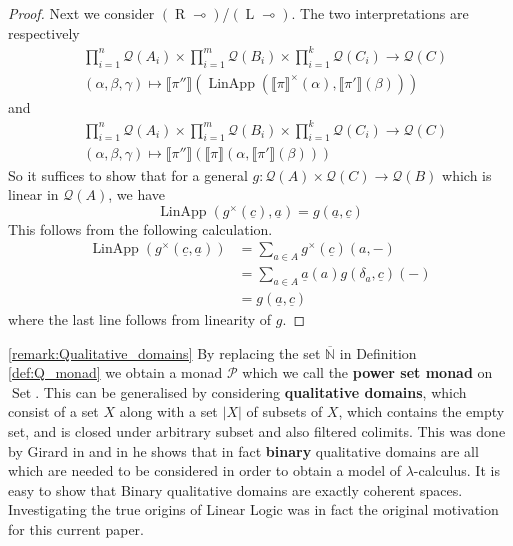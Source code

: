 \documentclass[runningheads]{llncs}
\newcommand{\bb}[1]{\mathbb{#1}}
\newcommand{\call}[1]{\mathcal{#1}}
\newcommand{\lto}{\longrightarrow}
\DeclareMathOperator{\set}{Set}
\begin{document}
\begin{proof}
Next we consider $(\operatorname{R}\multimap)$/$(\operatorname{L}\multimap)$. The two interpretations are respectively
\begin{align*}
&\prod_{i = 1}^n \call{Q}(A_i) \times \prod_{i = 1}^m \call{Q}(B_i) \times \prod_{i = 1}^k \call{Q}(C_i) \lto \call{Q}(C)\\
&(\alpha, \beta, \gamma) \longmapsto \llbracket \pi''\rrbracket(\operatorname{LinApp}(\llbracket \pi \rrbracket^\times(\alpha), \llbracket \pi'\rrbracket(\beta)))
\end{align*}
and
\begin{align*}
&\prod_{i = 1}^n \call{Q}(A_i) \times \prod_{i = 1}^m \call{Q}(B_i) \times \prod_{i = 1}^k \call{Q}(C_i) \lto \call{Q}(C)\\
&(\alpha, \beta, \gamma) \longmapsto \llbracket \pi'' \rrbracket(\llbracket \pi\rrbracket(\alpha, \llbracket \pi'\rrbracket(\beta)))
\end{align*}
So it suffices to show that for a general $g: \call{Q}(A) \times \call{Q}(C) \lto \call{Q}(B)$ which is linear in $\call{Q}(A)$, we have
\begin{equation}
\operatorname{LinApp}(g^\times(\underline{c}), \underline{a}) = g(\underline{a}, \underline{c})
\end{equation}
This follows from the following calculation.
\begin{align*}
\operatorname{LinApp}(g^\times(\underline{c}, \underline{a})) &= \sum_{a \in A}g^\times(\underline{c})(a, -)\\
&= \sum_{a \in A}\underline{a}(a)g(\delta_{a}, \underline{c})(-)\\
&= g(\underline{a}, \underline{c})
\end{align*}
where the last line follows from linearity of $g$.
\end{proof}
\begin{remark}\ref{remark:Qualitative_domains}
By replacing the set $\overline{\bb{N}}$ in Definition \ref{def:Q_monad} we obtain a monad $\call{P}$ which we call the \textbf{power set monad} on $\set$. This can be generalised by considering \textbf{qualitative domains}, which consist of a set $X$ along with a set $|X|$ of subsets of $X$, which contains the empty set, and is closed under arbitrary subset and also filtered colimits. This was done by Girard in \cite[d]{??} and in \cite[d]{??} he shows that in fact \textbf{binary} qualitative domains are all which are needed to be considered in order to obtain a model of $\lambda$-calculus. It is easy to show that Binary qualitative domains are exactly coherent spaces. Investigating the true origins of Linear Logic was in fact the original motivation for this current paper.
\end{remark}
\end{document}
